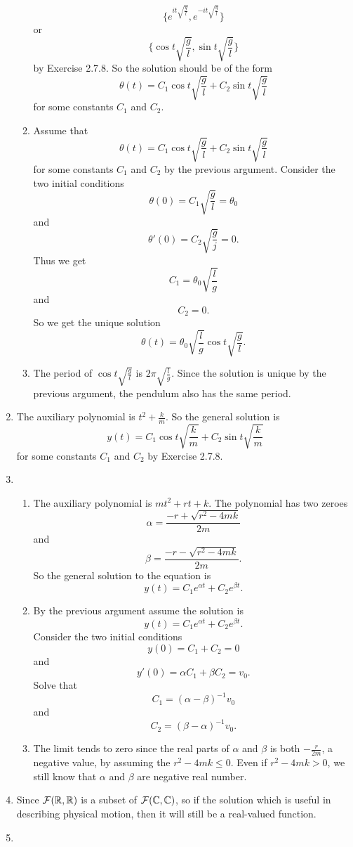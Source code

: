 \begin{enumerate}
\begin{enumerate}
\[\{e^{it\sqrt{\frac{g}{l}}},e^{-it\sqrt{\frac{g}{l}}}\}\]
or 
\[\{\cos t\sqrt{\frac{g}{l}},\sin t\sqrt{\frac{g}{l}}\}\]
by Exercise 2.7.8. So the solution should be of the form 
\[\theta(t)=C_1\cos t\sqrt{\frac{g}{l}}+C_2\sin t\sqrt{\frac{g}{l}} \]
for some constants $C_1$ and $C_2$.
\item Assume that 
\[\theta(t)=C_1\cos t\sqrt{\frac{g}{l}}+C_2\sin t\sqrt{\frac{g}{l}} \]
for some constants $C_1$ and $C_2$ by the previous argument. Consider the two initial conditions
\[\theta(0)=C_1\sqrt{\frac{g}{l}}=\theta_0 \]
and 
\[\theta'(0)=C_2\sqrt{\frac{g}{j}}=0. \]
Thus we get 
\[C_1=\theta_0\sqrt{\frac{l}{g}}\]
and 
\[C_2=0.\]
So we get the unique solution 
\[\theta(t)=\theta_0\sqrt{\frac{l}{g}}\cos t\sqrt{\frac{g}{l}}.\]
\item The period of $\cos t\sqrt{\frac{g}{l}}$ is $2\pi\sqrt{\frac{l}{g}}$. Since the solution is unique by the previous argument, the pendulum also has the same period.
\end{enumerate}
\item The auxiliary polynomial is $t^2+\frac{k}{m}$. So the general solution is 
\[y(t)=C_1\cos t\sqrt{\frac{k}{m}}+C_2\sin t\sqrt{\frac{k}{m}} \]
for some constants $C_1$ and $C_2$ by Exercise 2.7.8.
\item \begin{enumerate}
\item The auxiliary polynomial is $mt^2+rt+k$. The polynomial has two zeroes
\[\alpha=\frac{-r+\sqrt{r^2-4mk}}{2m}\]
and 
\[\beta=\frac{-r-\sqrt{r^2-4mk}}{2m}.\]
So the general solution to the equation is 
\[y(t)=C_1e^{\alpha t}+C_2e^{\beta t}.\]
\item By the previous argument assume the solution is 
\[y(t)=C_1e^{\alpha t}+C_2e^{\beta t}.\]
Consider the two initial conditions 
\[y(0)=C_1+C_2=0\]
and 
\[y'(0)=\alpha C_1+\beta C_2=v_0.\]
Solve that 
\[C_1=(\alpha-\beta)^{-1}v_0\]
and 
\[C_2=(\beta-\alpha)^{-1}v_0.\]
\item The limit tends to zero since the real parts of $\alpha$ and $\beta$ is both $-\frac{r}{2m}$, a negative value, by assuming the $r^2-4mk\leq 0$. Even if $r^2-4mk>0$, we still know that $\alpha$ and $\beta$ are negative real number.
\end{enumerate}
\item Since $\mathcal{F}(\mathbb{R},\mathbb{R})$ is a subset of $\mathcal{F}(\mathbb{C},\mathbb{C})$, so if the solution which is useful in describing physical motion, then it will still be a real-valued function.
\item \begin{enumerate}

\end{enumerate}
\end{enumerate}
